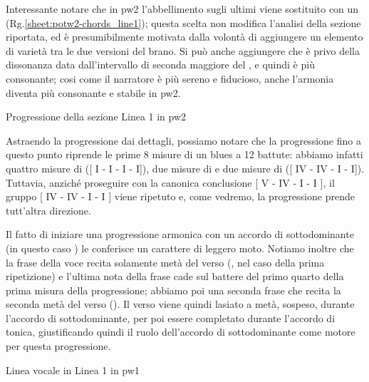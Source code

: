 \documentclass[class=book, crop=false, oneside, 12pt]{standalone}
\begin{document}
    Interessante notare che in \acrshort{pw2} l'abbellimento sugli ultimi  viene sostituito con un  (Rg.\ref{sheet:potw2-chords_line1}); questa scelta non modifica l'analisi della sezione riportata, ed è presumibilmente motivata dalla volontà di aggiungere un elemento di varietà tra le due versioni del brano. Si può anche aggiungere che  è privo della dissonanza data dall'intervallo di seconda maggiore del , e quindi è più consonante; cosi come il narratore  è più sereno e fiducioso, anche l'armonia diventa più consonante e stabile in \acrshort{pw2}.

    \begin{sheet}[htbp]
        \centering
        \caption{Progressione della sezione Linea 1 in \acrshort{pw2}}
        \label{sheet:potw2-chords_line1}
    \end{sheet}
    
    Astraendo la progressione dai dettagli, possiamo notare che la progressione  fino a questo punto riprende le prime 8 misure di un blues a 12 battute: abbiamo infatti quattro misure di  ([ I - I - I - I]), due misure di  e due misure di  ([ IV - IV - I - I]). Tuttavia, anziché proseguire con la canonica conclusione [ V - IV - I - I ], il gruppo [ IV - IV - I - I ] viene ripetuto e, come vedremo, la progressione prende tutt'altra direzione.

    
    Il fatto di iniziare una progressione armonica con un accordo di sottodominante (in questo caso ) le conferisce un carattere di leggero moto. Notiamo inoltre che la frase della voce recita solamente metà del verso (, nel caso della prima ripetizione) e l'ultima nota della frase  cade sul battere del primo quarto della prima misura della progressione; abbiamo poi una seconda frase che recita la seconda metà del verso (). Il verso viene quindi lasiato a metà, sospeso, durante l'accordo di sottodominante, per poi essere completato durante l'accordo di tonica, giustificando quindi il ruolo dell'accordo di sottodominante come motore per questa progressione.
    
    \begin{sheet}[htbp]
        \centering
        \caption{Linea vocale in Linea 1 in \acrshort{pw1}}
        \label{sheet:potw1-lyrics_line1}
    \end{sheet}
    
\end{document}
